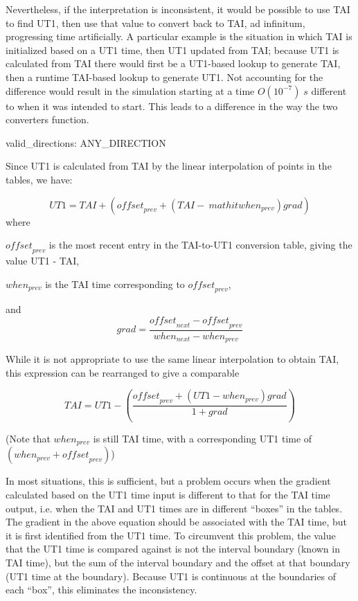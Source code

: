 {\begin{enumerate}
Nevertheless, if the interpretation is inconsistent, it would be
possible to use TAI to find UT1, then use that value to convert back to
TAI, ad infinitum, progressing time artificially.  A particular example
is the situation in which TAI is initialized based on a UT1 time, then
UT1 updated from TAI; because UT1 is calculated from TAI there would
first be a UT1-based lookup to generate TAI, then a runtime TAI-based
lookup to generate UT1.  Not accounting for the difference would result
in the simulation starting at a time $O(10^{-7}) \; s$ different to when it
was intended to start.  This leads to a difference in the way the two
converters
function.



{\begin{enumerate}
valid\_directions:
ANY\_DIRECTION

Since UT1 is calculated from TAI by the linear interpolation of points
in the tables, we have:

\begin{equation}
\mathit{UT1}=\mathit{TAI}+\left(\mathit{offset}_{\mathit{prev}}+(\mathit{TAI}-\
mathit{when}_{\mathit{prev}})\mathit{grad}\right)
\end{equation}
where

$\mathit{offset}_{prev}$ is the most recent entry in the
TAI-to-UT1 conversion table, giving the value UT1 - TAI,

${when}_{prev}$ is the TAI time corresponding to
$\mathit{offset}_{prev}$,

and
\begin{equation*}
grad=\frac{{\mathit{offset}_{next}-\mathit{offset}_{prev}}}{{when}_{next}-{when
}_{prev}}
\end{equation*}

While it is not appropriate to use the same linear interpolation to
obtain TAI, this expression can be rearranged to give a comparable

\begin{equation*}
\mathit{TAI}=\mathit{UT1}-
\left(\frac{\mathit{offset}_{\mathit{prev}}+
\left(\mathit{UT1}-\mathit{when}_{\mathit{prev}}\right)\mathit{grad}}
{1+\mathit{grad}}\right)
\end{equation*}

(Note that  $\mathit{when}_{\mathit{prev}}$ is still TAI time, with a
corresponding UT1 time of
$(\mathit{when}_{\mathit{prev}}+\mathit{offset}_{\mathit{prev}})$)

In most situations, this is sufficient, but a problem occurs when the
gradient calculated based on the UT1 time input is different to that
for the TAI time output, i.e. when the TAI and UT1 times are in
different {\textquotedblleft}boxes{\textquotedblright} in the tables.
The gradient in the above equation should be associated with the TAI
time, but it is first identified from the UT1 time.  To circumvent this
problem, the value that the UT1 time is compared against is not the
interval boundary
(known in TAI time), but the sum of the interval boundary and the
offset at that boundary (UT1 time at the boundary).  Because UT1 is
continuous at the boundaries of each
{\textquotedblleft}box{\textquotedblright}, this eliminates the
inconsistency.


\end{enumerate}}
\end{enumerate}}
